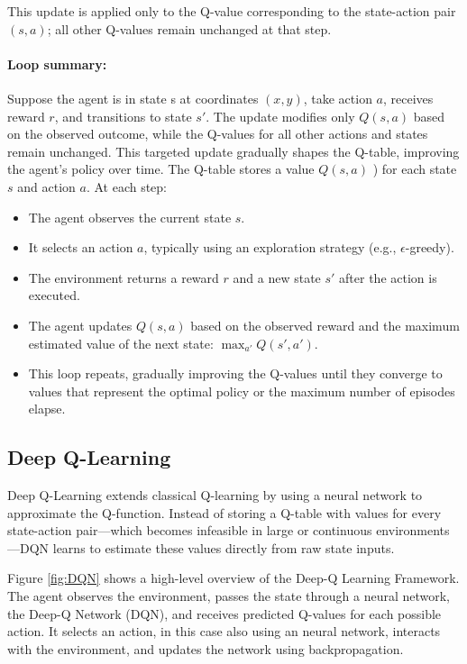 \documentclass[12pt]{article}
\begin{document}
This update is applied only to the Q-value corresponding to the state-action pair $(s,a)$; all other Q-values
remain unchanged at that step.

\paragraph{Loop summary:}
Suppose the agent is in state s at coordinates $(x,y)$, take action $a$, receives reward $r$, and transitions to state $s'$. The update modifies only $Q(s,a)$ based on the observed outcome, while the Q-values for all other actions and states remain unchanged. This targeted update gradually shapes the Q-table, improving the agent’s policy over time.
The Q-table stores a value $Q(s,a)$ ) for each state $s$ and action $a$. At each step:
\begin{itemize}
  \item The agent observes the current state $s$.
  \item It selects an action $a$, typically using an exploration strategy (e.g., $\epsilon$-greedy).
  \item The environment returns a reward $r$ and a new state $s'$ after the action is executed.
  \item The agent updates $Q(s,a)$ based on the observed reward and the maximum estimated value of the next state: $\max_{a'}Q(s',a')$.
  \item This loop repeats, gradually improving the Q-values until they converge to values that represent the optimal policy or the maximum number of episodes elapse.
\end{itemize}

\subsection{Deep Q-Learning}
Deep Q-Learning extends classical Q-learning by using a neural network to approximate the Q-function. Instead of storing a Q-table with values for every state-action pair---which becomes infeasible in large or continuous environments---DQN learns to estimate these values directly from raw state inputs.

Figure \ref{fig:DQN} shows a high-level overview of the Deep-Q Learning Framework. The agent observes the environment, passes the state through a neural network, the Deep-Q Network (DQN), and receives predicted
Q-values for each possible action. It selects an action, in this case also using an neural network, interacts
with the environment, and updates the network using backpropagation.
\end{document}
